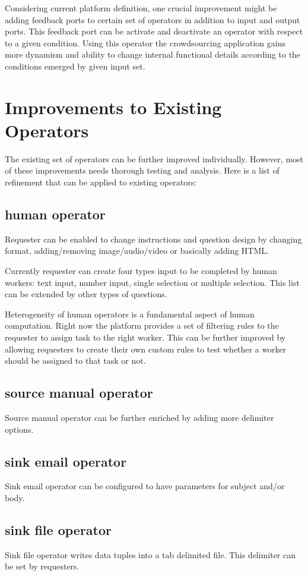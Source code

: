 Considering current platform definition, one crucial improvement might be adding feedback ports to certain set of operators in addition to input and output ports. This feedback port can be activate and deactivate an operator with respect to a given condition. Using this operator the crowdsourcing application gains more dynamism and ability to change internal functional details according to the conditions emerged by given input set.

\section{Improvements to Existing Operators}
The existing set of operators can be further improved individually. However, most of these improvements needs thorough testing and analysis. Here is a list of refinement that can be applied to existing operators: 

\subsection{human operator}
Requester can be enabled to change instructions and question design by changing format, adding/removing image/audio/video or basically adding HTML.

Currently requester can create four types input to be completed by human workers: text input, number input, single selection or multiple selection. This list can be extended by other types of questions.

Heterogeneity of human operators is a fundamental aspect of human computation. Right now the platform provides a set of filtering rules to the requester to assign task to the right worker. This can be further improved by allowing requesters to create their own custom rules to test whether a worker should be assigned to that task or not.

\subsection{source manual operator}
Source manual operator can be further enriched by adding more delimiter options.

\subsection{sink email operator}
Sink email operator can be configured to have parameters for subject and/or body.

\subsection{sink file operator}
Sink file operator writes data tuples into a tab delimited file. This delimiter can be set by requesters.


